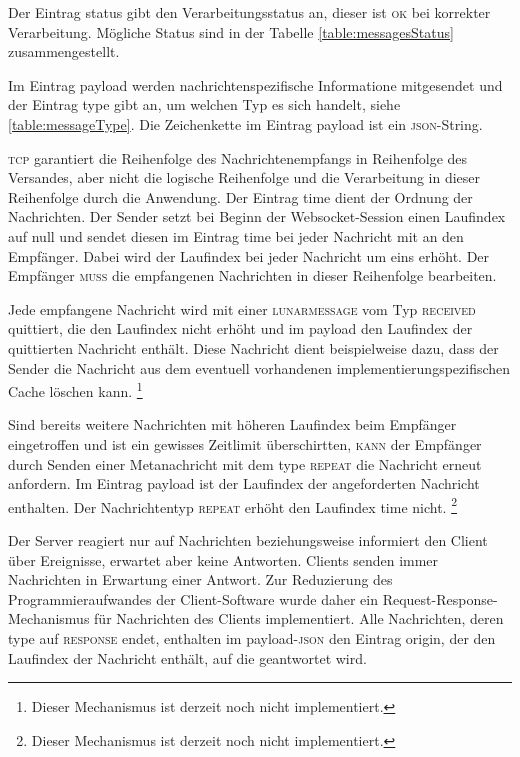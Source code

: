 \documentclass[ngerman,11pt]{report}
\begin{document}
Der Eintrag status gibt den Verarbeitungsstatus an, dieser ist \textsc{ok} bei korrekter
Verarbeitung. Mögliche Status sind in der Tabelle \ref{table:messagesStatus} zusammengestellt.

Im Eintrag payload werden nachrichtenspezifische Informatione mitgesendet und der Eintrag
type gibt an, um welchen Typ es sich handelt, siehe \ref{table:messageType}. Die Zeichenkette
im Eintrag payload ist ein \textsc{json}-String.

\textsc{tcp} garantiert die Reihenfolge des Nachrichtenempfangs in Reihenfolge des Versandes,
aber nicht die logische Reihenfolge und die Verarbeitung in dieser Reihenfolge durch die
Anwendung. Der Eintrag time dient der Ordnung der Nachrichten. Der Sender setzt bei Beginn
der Websocket-Session einen Laufindex auf null und sendet diesen im Eintrag time bei jeder
Nachricht mit an den Empfänger. Dabei wird der Laufindex bei jeder Nachricht um eins erhöht.
Der Empfänger \textsc{muss} die empfangenen Nachrichten in dieser Reihenfolge bearbeiten.

Jede empfangene Nachricht wird mit einer \textsc{lunarmessage} vom Typ \textsc{received} quittiert,
die den Laufindex nicht erhöht und im payload den Laufindex der quittierten Nachricht enthält.
Diese Nachricht dient beispielweise dazu, dass der Sender die Nachricht aus dem eventuell vorhandenen
implementierungspezifischen Cache löschen kann.
\footnote{Dieser Mechanismus ist derzeit noch nicht implementiert.}

Sind bereits weitere Nachrichten mit höheren Laufindex beim Empfänger eingetroffen und ist ein gewisses
Zeitlimit überschirtten, \textsc{kann} der Empfänger durch Senden einer Metanachricht mit dem
type \textsc{repeat} die Nachricht erneut anfordern. Im Eintrag payload ist der Laufindex der
angeforderten Nachricht enthalten. Der Nachrichtentyp \textsc{repeat} erhöht den Laufindex time nicht.
\footnote{Dieser Mechanismus ist derzeit noch nicht implementiert.}

Der Server reagiert nur auf Nachrichten beziehungsweise informiert den Client über Ereignisse,
erwartet aber keine Antworten. Clients senden immer Nachrichten in Erwartung einer Antwort.
Zur Reduzierung des Programmieraufwandes der Client-Software wurde daher ein
Request-Response-Mechanismus für Nachrichten des Clients implementiert. Alle Nachrichten, deren
type auf \textsc{response} endet, enthalten im payload-\textsc{json} den Eintrag origin, der
den Laufindex der Nachricht enthält, auf die geantwortet wird.
\end{document}
